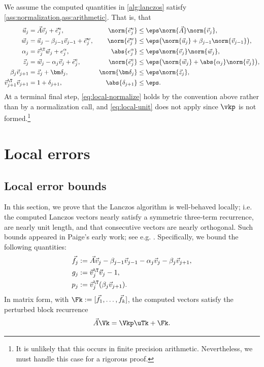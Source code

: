 We assume the computed quantities in \cref{alg:lanczos} satisfy \cref{ass:normalization,ass:arithmetic}.
That is, that
\begin{align}\allowdisplaybreaks
 \vec u_j
 &=\vec A\vec v_j+\vec e^u_j,
 &\norm{\vec e^u_j}
 &\le\eps\norm{\vec A}\norm{\vec v_j},
 \label{eq:local-u}\\
 \vec w_j
 &=\vec u_j-\beta_{j-1}\vec v_{j-1}+\vec e^w_j,
 &\norm{\vec e^w_j}
 &\le\eps\bigl(\norm{\vec u_j}
       +\beta_{j-1}\norm{\vec v_{j-1}}\bigr),
 \label{eq:local-w}\\
 \alpha_j
 &=\vec v_j^\T\vec w_j+e^\alpha_j,
 &\abs{e^\alpha_j}
 &\le\eps\norm{\vec v_j}\norm{\vec w_j},
 \label{eq:local-alpha}\\
 \vec z_j
 &=\vec w_j-\alpha_j\vec v_j+\vec e^z_j,
 &\norm{\vec e^z_j}
 &\le\eps\bigl(\norm{\vec w_j}
       +\abs{\alpha_j}\norm{\vec v_j}\bigr),
 \label{eq:local-z}\\
 \beta_j\vec v_{j+1}
 &=\vec z_j+\bm\delta_j,
 &\norm{\bm\delta_j}
 &\le\eps\norm{\vec z_j},
 \label{eq:local-normalize}\\
 \vec v_{j+1}^\T\vec v_{j+1}
 &=1+\delta_{j+1},
 &\abs{\delta_{j+1}}
 &\le\eps.
 \label{eq:local-unit}
\end{align}
At a terminal final step, \cref{eq:local-normalize} holds by the convention above rather than by a normalization call, and \cref{eq:local-unit} does not apply since \(\vkp\) is not formed.\footnote{It is unlikely that this occurs in finite precision arithmetic. Nevertheless, we must handle this case for a rigorous proof.}


\section{Local errors}
\label{sec:local}

\subsection{Local error bounds}

In this section, we prove that the Lanczos algorithm is well-behaved locally; i.e. the computed Lanczos vectors nearly satisfy a symmetric three-term recurrence, are nearly unit length, and that consecutive vectors are nearly orthogonal.
Such bounds appeared in Paige's early work; see e.g. \cite[\S2-3]{paige1976}.
Specifically, we bound the following quantities:
\begin{equation}
  \begin{aligned}
     \vec f_j&:=\vec A\vec v_j-\beta_{j-1}\vec v_{j-1}-\alpha_j\vec v_j-\beta_j\vec v_{j+1},
 \\
 g_j&:=\vec v_j^\T\vec v_j-1,
 \\
 p_j&:=\vec v_j^\T(\beta_j\vec v_{j+1}).
  \end{aligned}
 \label{eq:derived-quantities}
\end{equation}
In matrix form, with \(\Fk:=[\vec f_1,\ldots,\vec f_k]\), the computed vectors satisfy the perturbed block recurrence
\begin{equation}
 \vec A\Vk=\Vkp\uTk+\Fk.
 \label{eq:governing}
\end{equation}


